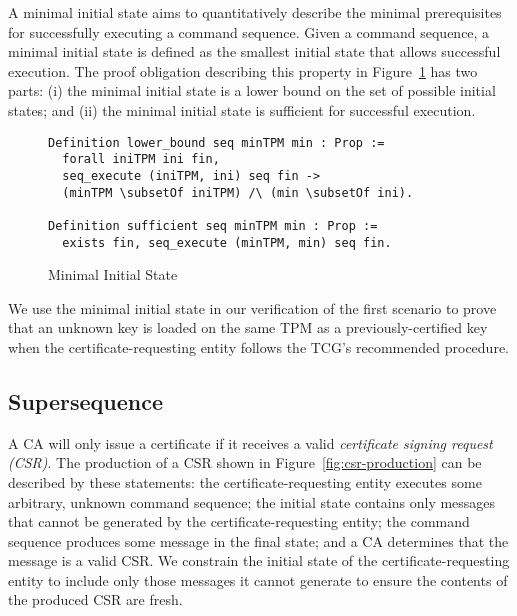 \documentclass[runningheads]{llncs}
\begin{document}
A minimal initial state aims to quantitatively describe the minimal
prerequisites for successfully executing a command sequence.  
Given a command sequence,
a minimal initial state is defined as the smallest initial state that
allows successful execution. The proof obligation describing this
property in Figure~\ref{fig:minimal-initial-state} has two parts: (i)
the minimal initial state is a lower bound on the set of possible
initial states; and (ii) the minimal initial state is sufficient for
successful execution.
\begin{figure}[hbtp]
\vspace{-\medskipamount}
\vspace{-\medskipamount}
\begin{lstlisting}[language=Coq]
Definition lower_bound seq minTPM min : Prop :=
  forall iniTPM ini fin,
  seq_execute (iniTPM, ini) seq fin ->
  (minTPM \subsetOf iniTPM) /\ (min \subsetOf ini).

Definition sufficient seq minTPM min : Prop :=
  exists fin, seq_execute (minTPM, min) seq fin.
\end{lstlisting}
\caption{Minimal Initial State}
\label{fig:minimal-initial-state}
\end{figure}
We use the minimal initial state in our verification of the first 
scenario to prove that an unknown key is
loaded on the same TPM as a previously-certified key when the
certificate-requesting entity follows the TCG's
recommended procedure.  

\subsection{Supersequence}

A CA will only issue a certificate if it receives a valid
\emph{certificate signing request (CSR)}.  The production of a CSR
shown in Figure~\ref{fig:csr-production} can be described by these
statements: the certificate-requesting entity executes some arbitrary,
unknown command sequence; the initial state contains only messages
that cannot be generated by the certificate-requesting entity; the
command sequence produces some message in the final state; and a CA
determines that the message is a valid CSR.  We constrain the initial
state of the certificate-requesting entity to include only those
messages it cannot generate to ensure the contents of the
produced CSR are fresh.
\end{document}
